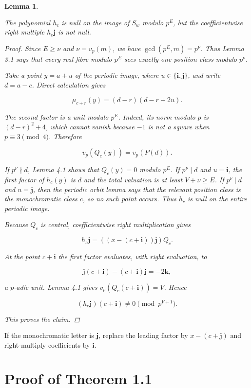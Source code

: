 \documentclass[11pt]{article}
\newtheorem{lemma}[theorem]{Lemma}
\numberwithin{equation}{section}
\begin{document}
\begin{lemma}
\label{lem:obstruction}

The polynomial $h_c$ is null on the image of $S_w$ modulo $p^E$, but the
coefficientwise right multiple $h_c\mathbf j$ is not null.

\begin{proof}

Since $E\ge\nu$ and $\nu=v_p(m)$, we have
$\gcd(p^E,m)=p^\nu$. Thus Lemma 3.1 says that every real fibre modulo $p^E$
sees exactly one position class modulo $p^\nu$.

Take a point $y=a+u$ of the periodic image, where
$u\in\{\mathbf i,\mathbf j\}$, and write $d=a-c$. Direct calculation gives

\[
\mu_{c+r}(y)=(d-r)(d-r+2u).
\]

The second factor is a unit modulo $p^E$. Indeed, its norm modulo $p$ is
$(d-r)^2+4$, which cannot vanish because $-1$ is not a square when
$p\equiv3\pmod4$. Therefore

\[
v_p(Q_c(y))=v_p(P(d)).
\]

If $p^\nu\nmid d$, Lemma 4.1 shows that $Q_c(y)=0$ modulo $p^E$. If
$p^\nu\mid d$ and $u=\mathbf i$, the first factor of $h_c(y)$ is $d$ and
the total valuation is at least $V+\nu\ge E$. If
$p^\nu\mid d$ and $u=\mathbf j$, then the periodic orbit lemma says that
the relevant position class is the monochromatic class $c$, so no such
point occurs. Thus $h_c$ is null on the entire periodic image.

Because $Q_c$ is central, coefficientwise right multiplication gives

\[
h_c\mathbf j=((x-(c+\mathbf i))\mathbf j)Q_c.
\]

At the point $c+\mathbf i$ the first factor evaluates, with right
evaluation, to

\[
\mathbf j(c+\mathbf i)-(c+\mathbf i)\mathbf j=-2\mathbf k,
\]

a $p$-adic unit. Lemma 4.1 gives
$v_p(Q_c(c+\mathbf i))=V$. Hence

\[
(h_c\mathbf j)(c+\mathbf i)\ne0\pmod {p^{V+1}}.
\]

This proves the claim.
\end{proof}

\end{lemma}


If the monochromatic letter is $\mathbf j$, replace the leading factor by
$x-(c+\mathbf j)$ and right-multiply coefficients by $\mathbf i$.

\section{Proof of Theorem 1.1}
\end{document}
